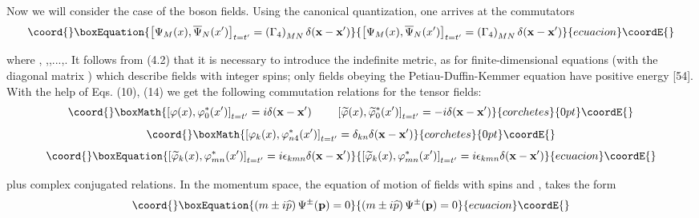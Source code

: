 \documentclass[a4paper,12pt]{article}
\begin{document}
Now we will consider the case of the boson fields. Using the canonical
quantization, one arrives at the commutators
\begin{equation}\coord{}\boxEquation{
\left[ \Psi _M(x),\overline{\Psi }_N(x^{\prime })\right] _{t=t^{\prime
}}=\left( \Gamma _4\right) _{MN}\delta (\mathbf{x}-\mathbf{x}^{\prime })
\label{64}
}{
\left[ \Psi _M(x),\overline{\Psi }_N(x^{\prime })\right] _{t=t^{\prime
}}=\left( \Gamma _4\right) _{MN}\delta (\mathbf{x}-\mathbf{x}^{\prime })
}{ecuacion}\coordE{}\end{equation}

where \coordHE{}, \coordHE{},\coordHE{},...,\coordHE{}. It follows from (4.2) that it is necessary to
introduce the indefinite metric, as for finite-dimensional equations (with
the diagonal matrix \coordHE{}) which describe fields with integer spins;
only fields obeying the Petiau-Duffin-Kemmer equation have positive energy
[54]. With the help of Eqs. (10), (14) we get the following commutation
relations for the tensor fields:
\[\coord{}\boxMath{
\left[ \varphi (x),\varphi _0^{*}(x^{\prime })\right]
_{t=t^{\prime }}=i\delta (\mathbf{x}-\mathbf{x}^{\prime
})\hspace{0.3in}\left[ \widetilde{ \varphi }(x),\widetilde{\varphi
}_0^{*}(x^{\prime })\right] _{t=t^{\prime }}=-i\delta
(\mathbf{x}-\mathbf{x}^{\prime })
}{corchetes}{0pt}\coordE{}\]
\[\coord{}\boxMath{
\left[ \varphi _k(x),\varphi _{n4}^{*}(x^{\prime })\right] _{t=t^{\prime
}}=\delta _{kn}\delta (\mathbf{x}-\mathbf{x}^{\prime })
}{corchetes}{0pt}\coordE{}\]
\begin{equation}\coord{}\boxEquation{
\left[ \widetilde{\varphi }_k(x),\varphi _{mn}^{*}(x^{\prime })\right]
_{t=t^{\prime }}=i\epsilon _{kmn}\delta (\mathbf{x}-\mathbf{x}^{\prime })
\label{65}
}{
\left[ \widetilde{\varphi }_k(x),\varphi _{mn}^{*}(x^{\prime })\right]
_{t=t^{\prime }}=i\epsilon _{kmn}\delta (\mathbf{x}-\mathbf{x}^{\prime })
}{ecuacion}\coordE{}\end{equation}

plus complex conjugated relations. In the momentum space, the equation of
motion of fields with spins \coordHE{} and \coordHE{}, takes the form
\begin{equation}\coord{}\boxEquation{
\left( m\pm i\widehat{p}\right) \Psi ^{\pm }(\mathbf{p})=0  \label{66}
}{
\left( m\pm i\widehat{p}\right) \Psi ^{\pm }(\mathbf{p})=0  }{ecuacion}\coordE{}\end{equation}
\end{document}
